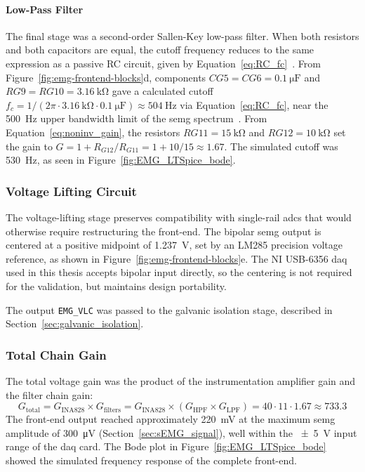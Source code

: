 \paragraph{Low-Pass Filter} %
\label{sec:EMG_lpf}
The final stage was a second-order Sallen-Key low-pass filter. When both resistors and both capacitors are equal, the cutoff frequency reduces to the same expression as a passive RC circuit, given by Equation~\ref{eq:RC_fc}~\cite{mancini_ron_op_2002}. From Figure~\ref{fig:emg-frontend-blocks}d, components $CG5 = CG6 = \SI{0.1}{\micro\farad}$ and $RG9 = RG10 = \SI{3.16}{\kilo\ohm}$ gave a calculated cutoff $f_c = 1/(2\pi \cdot \SI{3.16}{\kilo\ohm} \cdot \SI{0.1}{\micro\farad}) \approx \SI{504}{\hertz}$ via Equation~\ref{eq:RC_fc}, near the \SI{500}{\hertz} upper bandwidth limit of the \gls{semg} spectrum~\cite{kamen_essentials_2010}. From Equation~\ref{eq:noninv_gain}, the resistors $RG11 = \SI{15}{\kilo\ohm}$ and $RG12 = \SI{10}{\kilo\ohm}$ set the gain to $G = 1 + R_{G12}/R_{G11} = 1 + 10/15 \approx \num{1.67}$. The simulated cutoff was \SI{530}{\hertz}, as seen in Figure~\ref{fig:EMG_LTSpice_bode}.

\subsubsection{Voltage Lifting Circuit} 
\label{sec:EMG_voltage_lifter}
The voltage-lifting stage preserves compatibility with single-rail \glspl{adc} that would otherwise require restructuring the front-end. The bipolar \gls{semg} output is centered at a positive midpoint of \SI{1.237}{\volt}, set by an LM285 precision voltage reference, as shown in Figure~\ref{fig:emg-frontend-blocks}e. The NI USB-6356 \gls{daq} used in this thesis accepts bipolar input directly, so the centering is not required for the validation, but maintains design portability.

The output \texttt{EMG\_VLC} was passed to the galvanic isolation stage, described in Section~\ref{sec:galvanic_isolation}.

\subsubsection{Total Chain Gain}
\label{sec:EMG_total_gain}
The total voltage gain was the product of the instrumentation amplifier gain and the filter chain gain:
\begin{equation}
    G_\text{total} = G_\text{INA828} \times G_\text{filters}
    = G_\text{INA828} \times (G_\text{HPF} \times G_\text{LPF}) = \num{40} \cdot \num{11} \cdot \num{1.67} \approx \num{733.3}
    \label{eq:total-gain}
\end{equation}
The front-end output reached approximately \SI{220}{\milli\volt} at the maximum \gls{semg} amplitude of \SI{300}{\micro\volt} (Section~\ref{sec:sEMG_signal}), well within the \SI{\pm5}{\volt} input range of the \gls{daq} card. The Bode plot in Figure~\ref{fig:EMG_LTSpice_bode} showed the simulated frequency response of the complete front-end.


